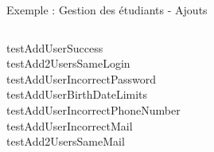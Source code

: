 \documentclass{beamer}
\begin{document}
\begin{frame}
\begin{block}{Exemple : Gestion des étudiants - Ajouts}
\begin{columns}
\begin{column}{.5\textwidth}
              \begin{center}
                \begin{small}
                  testAddUserSuccess\\
                  testAdd2UsersSameLogin\\
                  testAddUserIncorrectPassword\\
                  testAddUserBirthDateLimits\\
                  testAddUserIncorrectPhoneNumber\\
                  testAddUserIncorrectMail\\
                  testAdd2UsersSameMail\\
                \end{small}
              \end{center}
            \end{column}
          \end{columns}
        \end{block}
      \end{frame}
      
\end{document}
